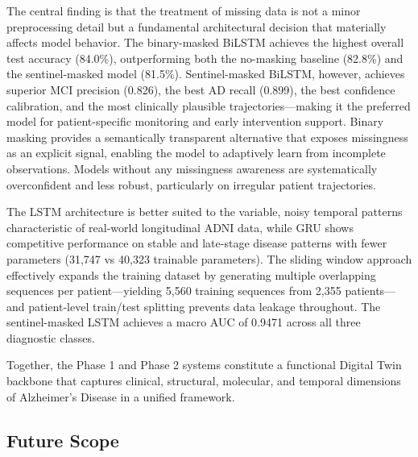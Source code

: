 \documentclass[12pt,singleside,a4paper]{article}
\begin{document}
The central finding is that the treatment of missing data is not a minor preprocessing detail but a fundamental architectural decision that materially affects model behavior. The binary-masked BiLSTM achieves the highest overall test accuracy (84.0\%), outperforming both the no-masking baseline (82.8\%) and the sentinel-masked model (81.5\%). Sentinel-masked BiLSTM, however, achieves superior MCI precision (0.826), the best AD recall (0.899), the best confidence calibration, and the most clinically plausible trajectories—making it the preferred model for patient-specific monitoring and early intervention support. Binary masking provides a semantically transparent alternative that exposes missingness as an explicit signal, enabling the model to adaptively learn from incomplete observations. Models without any missingness awareness are systematically overconfident and less robust, particularly on irregular patient trajectories.

The LSTM architecture is better suited to the variable, noisy temporal patterns characteristic of real-world longitudinal ADNI data, while GRU shows competitive performance on stable and late-stage disease patterns with fewer parameters (31,747 vs 40,323 trainable parameters). The sliding window approach effectively expands the training dataset by generating multiple overlapping sequences per patient—yielding 5,560 training sequences from 2,355 patients—and patient-level train/test splitting prevents data leakage throughout. The sentinel-masked LSTM achieves a macro AUC of 0.9471 across all three diagnostic classes.

Together, the Phase 1 and Phase 2 systems constitute a functional Digital Twin backbone that captures clinical, structural, molecular, and temporal dimensions of Alzheimer's Disease in a unified framework.

\subsection{Future Scope}
\end{document}
